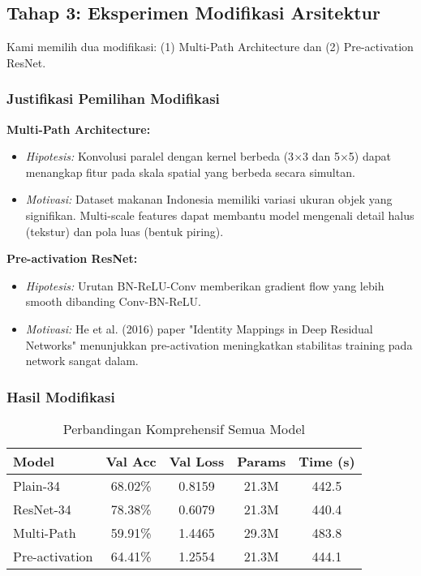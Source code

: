 \documentclass[11pt,a4paper]{article}
\begin{document}
\subsection{Tahap 3: Eksperimen Modifikasi Arsitektur}

Kami memilih dua modifikasi: (1) Multi-Path Architecture dan (2) Pre-activation ResNet.

\subsubsection{Justifikasi Pemilihan Modifikasi}

\textbf{Multi-Path Architecture:}
\begin{itemize}
    \item \textit{Hipotesis:} Konvolusi paralel dengan kernel berbeda (3$\times$3 dan 5$\times$5) dapat menangkap fitur pada skala spatial yang berbeda secara simultan.
    \item \textit{Motivasi:} Dataset makanan Indonesia memiliki variasi ukuran objek yang signifikan. Multi-scale features dapat membantu model mengenali detail halus (tekstur) dan pola luas (bentuk piring).
\end{itemize}

\textbf{Pre-activation ResNet:}
\begin{itemize}
    \item \textit{Hipotesis:} Urutan BN-ReLU-Conv memberikan gradient flow yang lebih smooth dibanding Conv-BN-ReLU.
    \item \textit{Motivasi:} He et al. (2016) paper "Identity Mappings in Deep Residual Networks" menunjukkan pre-activation meningkatkan stabilitas training pada network sangat dalam.
\end{itemize}

\subsubsection{Hasil Modifikasi}

\begin{table}[h]
\centering
\caption{Perbandingan Komprehensif Semua Model}
\begin{tabular}{lcccc}
\toprule
\textbf{Model} & \textbf{Val Acc} & \textbf{Val Loss} & \textbf{Params} & \textbf{Time (s)} \\ 
\midrule
Plain-34 & 68.02\% & 0.8159 & 21.3M & 442.5 \\
ResNet-34 & 78.38\% & 0.6079 & 21.3M & 440.4 \\
Multi-Path & 59.91\% & 1.4465 & 29.3M & 483.8 \\
Pre-activation & 64.41\% & 1.2554 & 21.3M & 444.1 \\
\bottomrule
\end{tabular}
\end{table}
\end{document}
